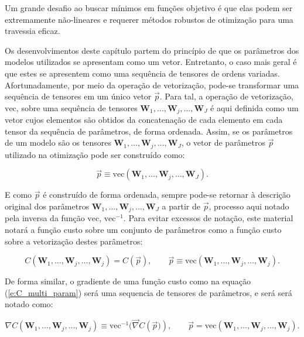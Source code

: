     Um grande desafio ao buscar mínimos em funções objetivo é que elas podem ser extremamente não-lineares e requerer métodos robustos de otimização para uma travessia eficaz.

    Os desenvolvimentos deste capítulo partem do princípio de que os parâmetros dos modelos utilizados se apresentam como um vetor. Entretanto, o caso mais geral é que estes se apresentem como uma sequência de tensores de ordens variadas. Afortunadamente, por meio da operação de vetorização, pode-se transformar uma sequência de tensores em um único vetor $\vec{p}$. Para tal, a operação de vetorização, $\text{vec}$, sobre uma sequência de tensores $\boldsymbol{W}_1, \ldots, \boldsymbol{W}_j, \ldots, \boldsymbol{W}_J$ é aqui definida como um vetor cujos elementos são obtidos da concatenação de cada elemento em cada tensor da sequência de parâmetros, de forma ordenada. Assim, se os parâmetros de um modelo são os tensores $\boldsymbol{W}_1, \ldots, \boldsymbol{W}_j, \ldots, \boldsymbol{W}_J$, o vetor de parâmetros $\vec{p}$ utilizado na otimização pode ser construído como:

  \begin{equation}
    \vec{p} \equiv \text{vec}(\boldsymbol{W}_1, \ldots, \boldsymbol{W}_j, \ldots, \boldsymbol{W}_J)
    .
  \end{equation}

  \noindent E como $\vec{p}$ é construído de forma ordenada, sempre pode-se retornar à descrição original dos parâmetros $\boldsymbol{W}_1, \ldots, \boldsymbol{W}_j, \ldots, \boldsymbol{W}_J$ a partir de $\vec{p}$, processo aqui notado pela inversa da função $\text{vec}$, $\text{vec}^{-1}$. Para evitar excessos de notação, este material notará a função custo sobre um conjunto de parâmetros como a função custo sobre a vetorização destes parâmetros:

    \begin{equation} \label{e:C_multi_param}
      C(\boldsymbol{W}_1, \ldots, \boldsymbol{W}_j, \ldots, \boldsymbol{W}_j) =
      C(\vec{p}), \qquad \vec{p} \equiv
      \text{vec}(\boldsymbol{W}_1, \ldots, \boldsymbol{W}_j, \ldots, \boldsymbol{W}_j)
      .
    \end{equation}

    De forma similar, o gradiente de uma função custo como na equação (\ref{e:C_multi_param}) será uma sequencia de tensores de parâmetros, e será será notado como:

    \begin{equation} \label{e:grad_C_multi_param}
      \nabla C(\boldsymbol{W}_1, \ldots, \boldsymbol{W}_j, \ldots, \boldsymbol{W}_j) \equiv
      \text{vec}^{-1}(\vec{\nabla} C\left(\vec{p})\right), \qquad
      \vec{p} = \text{vec}(\boldsymbol{W}_1, \ldots, \boldsymbol{W}_j, \ldots, \boldsymbol{W}_j)
      .
    \end{equation}

